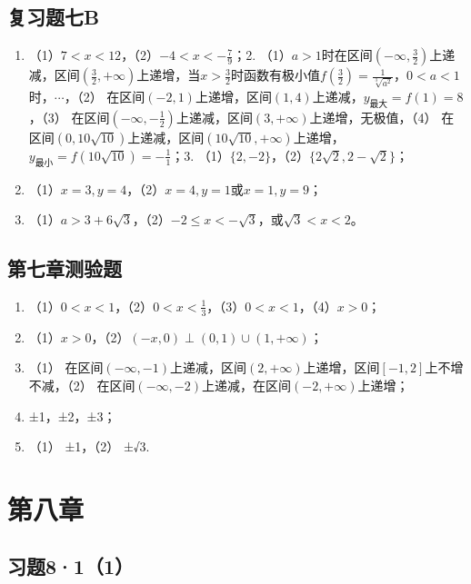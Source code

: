 \subsection{复习题七B}

\begin{enumerate}
\item
  （1）\(7 < x < 12\)，（2）\(-4 < x < -\frac{7}{9}\)；2.
  （1）\(a > 1\)时在区间\(\left(-\infty, \frac{3}{2}\right)\)上递减，区间\(\left(\frac{3}{2}, +\infty\right)\)上递增，当\(x > \frac{3}{2}\)时函数有极小值\(f\left(\frac{3}{2}\right) = \frac{1}{\sqrt[3]{a^2}}\)，\(0 < a < 1\)时，\(\cdots\)，（2）
  在区间\((-2, 1)\)上递增，区间\((1, 4)\)上递减，\(y_{\text{最大}} = f(1) = 8\)，（3）
  在区间\(\left(-\infty, -\frac{1}{2}\right)\)上递减，区间\((3, +\infty)\)上递增，无极值，（4）
  在区间\((0, 10\sqrt{10})\)上递减，区间\((10\sqrt{10}, +\infty)\)上递增，\(y_{\text{最小}} = f(10\sqrt{10}) = -\frac{1}{1}\)；3.
  （1）\(\{2, -2\}\)，（2）\(\{2\sqrt{2}, 2 - \sqrt{2}\}\)；
\item
  （1）\(x = 3, y = 4\)，（2）\(x = 4, y = 1\)或\(x = 1, y = 9\)；
\item
  （1）\(a > 3 + 6\sqrt{3}\)，（2）\(-2 \leq x < -\sqrt{3}\)，或\(\sqrt{3} < x < 2\)。
\end{enumerate}

\subsection{第七章测验题}

\begin{enumerate}
\item
  （1）\(0 < x < 1\)，（2）\(0 < x < \frac{1}{3}\)，（3）\(0 < x < 1\)，（4）\(x > 0\)；
\item
  （1）\(x > 0\)，（2）\((-x, 0) \perp (0, 1) \cup (1, +\infty)\)；
\item
  （1）
  在区间\((- \infty, -1)\)上递减，区间\((2, +\infty)\)上递增，区间\([-1, 2]\)上不增不减，（2）
  在区间\((- \infty, -2)\)上递减，在区间\((-2, +\infty)\)上递增；
\item
  ±1，±2，±3；
\item
  （1） ±1，（2） ±√3.
\end{enumerate}

\section{第八章}

\subsection{习题8·1（1）}

